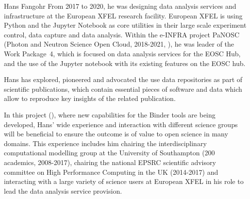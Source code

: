 \begin{participant}[type=leadPI,PM=5,gender=male]{Hans Fangohr}
  From 2017 to 2020, he was designing data analysis services and
  infrastructure at the European XFEL research facility. European XFEL
  is using Python and the Jupyter Notebook as core utilities in their
  large scale experiment control, data capture and data
  analysis. Within the e-INFRA project PaNOSC (Photon and Neutron
  Science Open Cloud, 2018-2021, \cite{panosc}), he was leader of the
  Work Package~4, which is focused on data analysis services for the
  EOSC Hub, and the use of the Jupyter notebook with its existing
  features on the EOSC hub.

  Hans has explored, pioneered and advocated the use data repositories as part
  of scientific publications, which contain essential pieces of software and
  data which allow to reproduce key insights of the related publication.

  In this project (\TheProject), where new capabilities for the Binder tools
  are being developed, Hans' wide experience and
  interaction with different science groups will be beneficial to
  ensure the outcome is of value to open science in many domains. This
  experience includes him chairing the interdisciplinary computational modelling
  group at the University of Southampton (200 academics, 2008-2017),
  chairing the national EPSRC scientific advisory committee on High
  Performance Computing in the UK (2014-2017) and interacting with a
  large variety of science users at European XFEL in his role
  to lead the data analysis service provision.
\end{participant}

